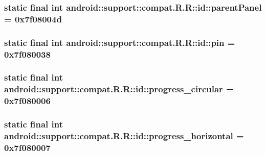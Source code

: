\hypertarget{classandroid_1_1support_1_1compat_1_1_r_1_1id_c9d70d2e8d26726062e1aa2a2710d5ef}{
\subsubsection[{parentPanel}]{\setlength{\rightskip}{0pt plus 5cm}static final int android::support::compat.R.R::id::parentPanel = 0x7f08004d}}
\label{classandroid_1_1support_1_1compat_1_1_r_1_1id_c9d70d2e8d26726062e1aa2a2710d5ef}


\hypertarget{classandroid_1_1support_1_1compat_1_1_r_1_1id_a0a61e3beb4399235f99d00da6d694f3}{
\subsubsection[{pin}]{\setlength{\rightskip}{0pt plus 5cm}static final int android::support::compat.R.R::id::pin = 0x7f080038}}
\label{classandroid_1_1support_1_1compat_1_1_r_1_1id_a0a61e3beb4399235f99d00da6d694f3}


\hypertarget{classandroid_1_1support_1_1compat_1_1_r_1_1id_9ad7b53f6eeb8b2dc553fddc3672b127}{
\subsubsection[{progress\_\-circular}]{\setlength{\rightskip}{0pt plus 5cm}static final int android::support::compat.R.R::id::progress\_\-circular = 0x7f080006}}
\label{classandroid_1_1support_1_1compat_1_1_r_1_1id_9ad7b53f6eeb8b2dc553fddc3672b127}


\hypertarget{classandroid_1_1support_1_1compat_1_1_r_1_1id_90d4761b78fa525087d82aee6ae9957c}{
\subsubsection[{progress\_\-horizontal}]{\setlength{\rightskip}{0pt plus 5cm}static final int android::support::compat.R.R::id::progress\_\-horizontal = 0x7f080007}}
\label{classandroid_1_1support_1_1compat_1_1_r_1_1id_90d4761b78fa525087d82aee6ae9957c}


